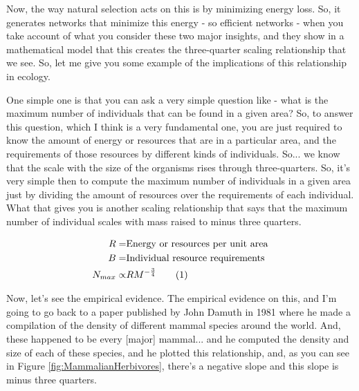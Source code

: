 \documentclass[]{article}
\newcommand\numberthis{\addtocounter{equation}{1}\tag{\theequation}}
\begin{document}
Now, the way natural selection
acts on this is
by minimizing energy loss.
So, it generates networks
that minimize this energy -
so efficient networks -
when you take account of what
you consider these two major insights,
and they show
in a mathematical model
that this creates the three-quarter
scaling relationship that we see.
So, let me give you some example
of the implications of this relationship
in ecology.

One simple one is that you can ask
a very simple question like -
what is the maximum number
of individuals
that can be found in a given area?
So, to answer this question,
which I think is a very fundamental one,
you are just required to know
the amount of energy or resources
that are in a particular area,
and the requirements of those resources
by different kinds of individuals.
So... we know that the scale
with the size of the organisms
rises through three-quarters.
So, it's very simple then to compute
the maximum number of individuals
in a given area
just by dividing the amount of resources
over the requirements of each individual.
What that gives you is
another scaling relationship
that says that the maximum number
of individual scales with mass
raised to minus three quarters.

\begin{align*}
	R=& \text{Energy or resources per unit area}\\
	B=&\text{Individual resource requirements}\\
	N_{max}\propto& R M^{-\frac{3}{4}}\label{eq:max}\numberthis
\end{align*}

Now, let's see the empirical evidence.
The empirical evidence on this,
and I'm going to go back
to a paper published by
John Damuth in 1981
where he made a compilation
of the density
of different mammal species
around the world.
And, these happened to be
every [major] mammal...
and he computed the density
and size of each of these species,
and he plotted this relationship,
and, as you can see in  Figure \ref{fig:MammalianHerbivores},
there's a negative slope and
this slope is minus three quarters.
\end{document}
